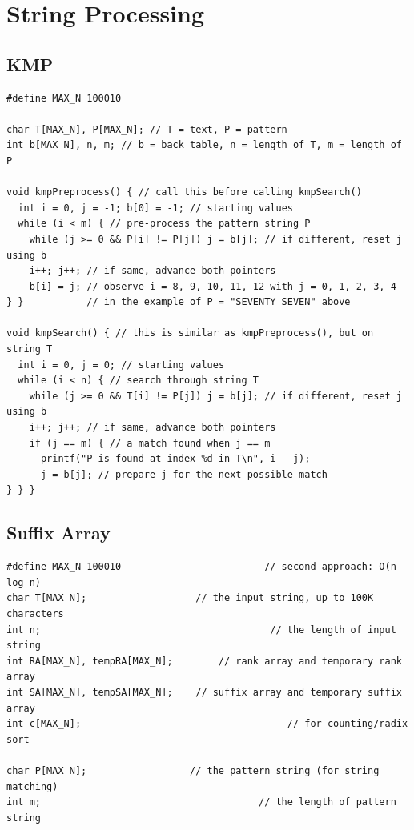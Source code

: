 \documentclass[10pt,landscape]{article}
\begin{document}
\begin{multicols}{2}
\begin{lstlisting}
\end{lstlisting}

\section{String Processing}
\subsection{KMP}
\begin{lstlisting}
#define MAX_N 100010

char T[MAX_N], P[MAX_N]; // T = text, P = pattern
int b[MAX_N], n, m; // b = back table, n = length of T, m = length of P

void kmpPreprocess() { // call this before calling kmpSearch()
  int i = 0, j = -1; b[0] = -1; // starting values
  while (i < m) { // pre-process the pattern string P
    while (j >= 0 && P[i] != P[j]) j = b[j]; // if different, reset j using b
    i++; j++; // if same, advance both pointers
    b[i] = j; // observe i = 8, 9, 10, 11, 12 with j = 0, 1, 2, 3, 4
} }           // in the example of P = "SEVENTY SEVEN" above

void kmpSearch() { // this is similar as kmpPreprocess(), but on string T
  int i = 0, j = 0; // starting values
  while (i < n) { // search through string T
    while (j >= 0 && T[i] != P[j]) j = b[j]; // if different, reset j using b
    i++; j++; // if same, advance both pointers
    if (j == m) { // a match found when j == m
      printf("P is found at index %d in T\n", i - j);
      j = b[j]; // prepare j for the next possible match
} } }
\end{lstlisting}

\subsection{Suffix Array}
\begin{lstlisting}
#define MAX_N 100010                         // second approach: O(n log n)
char T[MAX_N];                   // the input string, up to 100K characters
int n;                                        // the length of input string
int RA[MAX_N], tempRA[MAX_N];        // rank array and temporary rank array
int SA[MAX_N], tempSA[MAX_N];    // suffix array and temporary suffix array
int c[MAX_N];                                    // for counting/radix sort

char P[MAX_N];                  // the pattern string (for string matching)
int m;                                      // the length of pattern string


\end{lstlisting}
\end{multicols}
\end{document}
